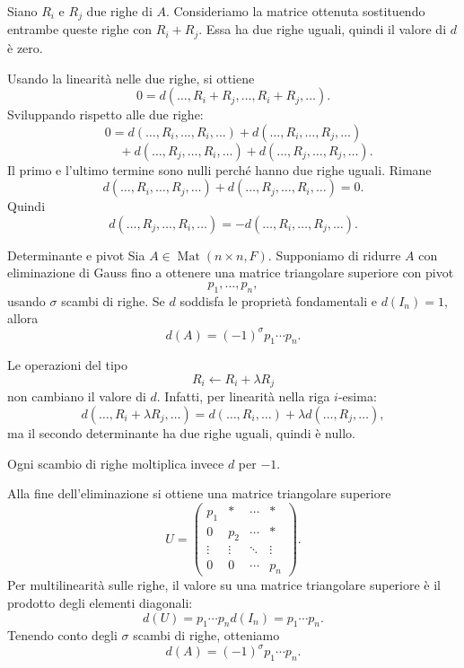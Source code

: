 \documentclass[a4paper]{article}
\begin{document}
\begin{snippetproof}{}
    Siano \(R_i\) e \(R_j\) due righe di \(A\). Consideriamo la matrice ottenuta sostituendo entrambe queste righe con \(R_i+R_j\). Essa ha due righe uguali, quindi il valore di \(d\) è zero.

    Usando la linearità nelle due righe, si ottiene
    \[
        0
        =
        d(\ldots,R_i+R_j,\ldots,R_i+R_j,\ldots).
    \]
    Sviluppando rispetto alle due righe:
    \[
        0
        =
        d(\ldots,R_i,\ldots,R_i,\ldots)
        +
        d(\ldots,R_i,\ldots,R_j,\ldots)
    \]
    \[
        \qquad
        +
        d(\ldots,R_j,\ldots,R_i,\ldots)
        +
        d(\ldots,R_j,\ldots,R_j,\ldots).
    \]
    Il primo e l'ultimo termine sono nulli perché hanno due righe uguali. Rimane
    \[
        d(\ldots,R_i,\ldots,R_j,\ldots)
        +
        d(\ldots,R_j,\ldots,R_i,\ldots)
        =
        0.
    \]
    Quindi
    \[
        d(\ldots,R_j,\ldots,R_i,\ldots)
        =
        -
        d(\ldots,R_i,\ldots,R_j,\ldots).
    \]
\end{snippetproof}

\begin{snippetproposition}{Determinante e pivot}
    Sia \(A\in\operatorname{Mat}(n\times n,F)\). Supponiamo di ridurre \(A\) con eliminazione di Gauss fino a ottenere una matrice triangolare superiore con pivot
    \[
        p_1,\ldots,p_n,
    \]
    usando \(\sigma\) scambi di righe. Se \(d\) soddisfa le proprietà fondamentali e \(d(I_n)=1\), allora
    \[
        d(A)=(-1)^\sigma p_1\cdots p_n.
    \]
\end{snippetproposition}

\begin{snippetproof}{}
    Le operazioni del tipo
    \[
        R_i\leftarrow R_i+\lambda R_j
    \]
    non cambiano il valore di \(d\). Infatti, per linearità nella riga \(i\)-esima:
    \[
        d(\ldots,R_i+\lambda R_j,\ldots)
        =
        d(\ldots,R_i,\ldots)
        +
        \lambda d(\ldots,R_j,\ldots),
    \]
    ma il secondo determinante ha due righe uguali, quindi è nullo.

    Ogni scambio di righe moltiplica invece \(d\) per \(-1\).

    Alla fine dell'eliminazione si ottiene una matrice triangolare superiore
    \[
        U=
        \begin{pmatrix}
            p_1 & * & \cdots & *\\
            0 & p_2 & \cdots & *\\
            \vdots & \vdots & \ddots & \vdots\\
            0 & 0 & \cdots & p_n
        \end{pmatrix}.
    \]
    Per multilinearità sulle righe, il valore su una matrice triangolare superiore è il prodotto degli elementi diagonali:
    \[
        d(U)=p_1\cdots p_n d(I_n)=p_1\cdots p_n.
    \]
    Tenendo conto degli \(\sigma\) scambi di righe, otteniamo
    \[
        d(A)=(-1)^\sigma p_1\cdots p_n.
    \]
\end{snippetproof}
\end{document}
